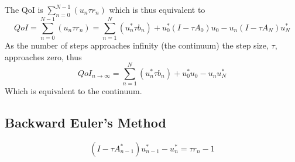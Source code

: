 \documentclass[12pt]{article}
\begin{document}
The QoI is $\sum_{n=0}^{N-1}\left( u_n \tau r_n\right)$ which is thus equivalent to
\begin{equation}\label{FEulerQoIa}
QoI = \sum_{n=0}^{N-1}\left( u_n \tau r_n\right) = \sum_{n=1}^N \left(u^*_n \tau b_n\right) + u^*_0(I-\tau A_0)u_0 - u_n(I-\tau A_N)u^*_N
\end{equation}
As the number of steps approaches infinity (the continuum) the step size, $\tau$, approaches zero, thus
\begin{equation}
QoI_{n\rightarrow\infty} = \sum_{n=1}^N \left(u^*_n \tau b_n\right) + u^*_0 u_0 - u_n u^*_N
\end{equation}
Which is equivalent to the continuum.
\subsection{Backward Euler's Method}
\begin{equation}\label{BEulerDiscrete}
(I-\tau A^*_{n-1})u^*_{n-1} - u^*_n = \tau r_n-1
\end{equation}
\end{document}
